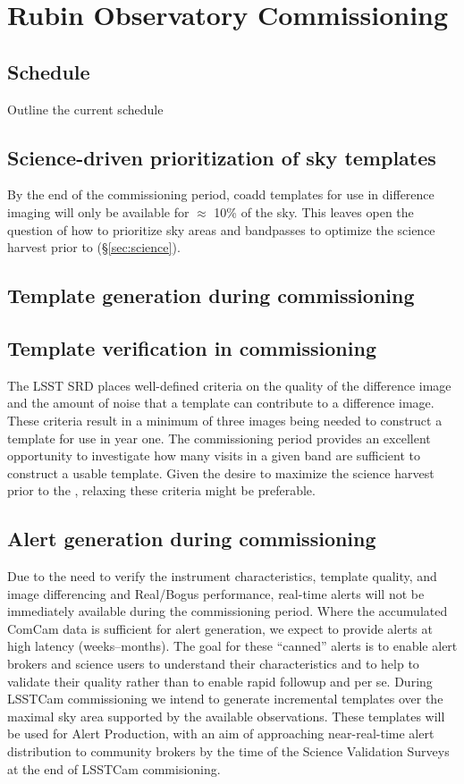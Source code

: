 \section{Rubin Observatory Commissioning} 
\label{sec:commissioning}

\subsection{Schedule}
Outline the current schedule 



\subsection{Science-driven prioritization of sky templates}
By the end of the commissioning period, coadd templates for use in difference imaging will only be available for $\approx$ 10\% of the sky. 
This leaves open the question of how to  prioritize  sky areas and bandpasses to optimize the science harvest prior to \drone (\S \ref{sec:science}).

\subsection{Template generation during commissioning}


\subsection{Template verification in commissioning}

The LSST SRD places well-defined criteria on the quality of the difference image and the amount of noise that a template can contribute to a difference image.  These criteria result in a minimum of three images being needed to construct a template for use in year one.  The commissioning period provides an excellent opportunity to investigate how many visits in a given band are sufficient to construct a usable template.  Given the desire to maximize the science harvest prior to the \drone,  relaxing these criteria might be preferable. 

\subsection{Alert generation during commissioning}

Due to the need to verify the instrument characteristics, template quality, and image differencing and Real/Bogus performance, real-time alerts will not be immediately available during the commissioning period. 
Where the accumulated ComCam data is sufficient for alert generation, we expect to provide alerts at high latency (weeks--months). 
The goal for these ``canned'' alerts is to enable alert brokers and science users to understand their characteristics and to help to validate their quality rather than to enable rapid followup and \es per se.
During LSSTCam commissioning we intend to generate incremental templates over the maximal sky area supported by the available observations.
These templates will be used for Alert Production, with an aim of approaching near-real-time alert distribution to community brokers by the time of the Science Validation Surveys at the end of LSSTCam commisioning. 
